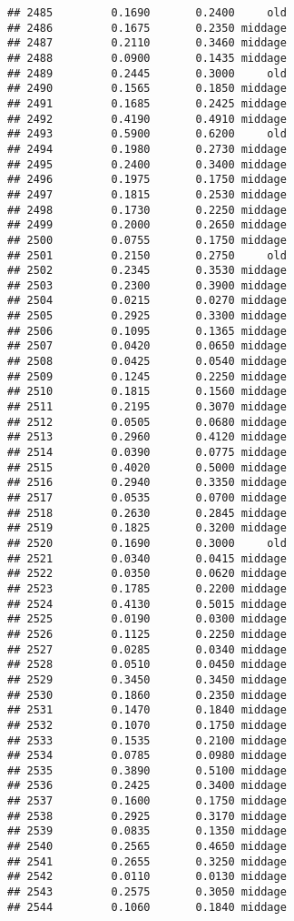 \documentclass[
]{article}
\begin{document}
\begin{verbatim}
## 2485         0.1690       0.2400     old
## 2486         0.1675       0.2350 middage
## 2487         0.2110       0.3460 middage
## 2488         0.0900       0.1435 middage
## 2489         0.2445       0.3000     old
## 2490         0.1565       0.1850 middage
## 2491         0.1685       0.2425 middage
## 2492         0.4190       0.4910 middage
## 2493         0.5900       0.6200     old
## 2494         0.1980       0.2730 middage
## 2495         0.2400       0.3400 middage
## 2496         0.1975       0.1750 middage
## 2497         0.1815       0.2530 middage
## 2498         0.1730       0.2250 middage
## 2499         0.2000       0.2650 middage
## 2500         0.0755       0.1750 middage
## 2501         0.2150       0.2750     old
## 2502         0.2345       0.3530 middage
## 2503         0.2300       0.3900 middage
## 2504         0.0215       0.0270 middage
## 2505         0.2925       0.3300 middage
## 2506         0.1095       0.1365 middage
## 2507         0.0420       0.0650 middage
## 2508         0.0425       0.0540 middage
## 2509         0.1245       0.2250 middage
## 2510         0.1815       0.1560 middage
## 2511         0.2195       0.3070 middage
## 2512         0.0505       0.0680 middage
## 2513         0.2960       0.4120 middage
## 2514         0.0390       0.0775 middage
## 2515         0.4020       0.5000 middage
## 2516         0.2940       0.3350 middage
## 2517         0.0535       0.0700 middage
## 2518         0.2630       0.2845 middage
## 2519         0.1825       0.3200 middage
## 2520         0.1690       0.3000     old
## 2521         0.0340       0.0415 middage
## 2522         0.0350       0.0620 middage
## 2523         0.1785       0.2200 middage
## 2524         0.4130       0.5015 middage
## 2525         0.0190       0.0300 middage
## 2526         0.1125       0.2250 middage
## 2527         0.0285       0.0340 middage
## 2528         0.0510       0.0450 middage
## 2529         0.3450       0.3450 middage
## 2530         0.1860       0.2350 middage
## 2531         0.1470       0.1840 middage
## 2532         0.1070       0.1750 middage
## 2533         0.1535       0.2100 middage
## 2534         0.0785       0.0980 middage
## 2535         0.3890       0.5100 middage
## 2536         0.2425       0.3400 middage
## 2537         0.1600       0.1750 middage
## 2538         0.2925       0.3170 middage
## 2539         0.0835       0.1350 middage
## 2540         0.2565       0.4650 middage
## 2541         0.2655       0.3250 middage
## 2542         0.0110       0.0130 middage
## 2543         0.2575       0.3050 middage
## 2544         0.1060       0.1840 middage

\end{verbatim}
\end{document}
